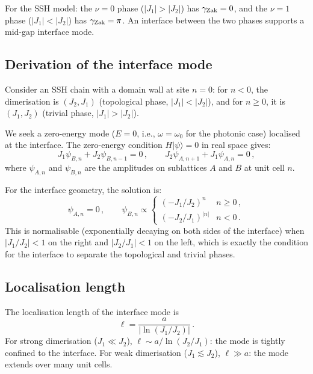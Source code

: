 For the SSH model: the $\nu=0$ phase ($|J_1|>|J_2|$) has $\gamma_{\mathrm{Zak}}=0$,
and the $\nu=1$ phase ($|J_1|<|J_2|$) has $\gamma_{\mathrm{Zak}}=\pi$.  An interface
between the two phases supports a mid-gap interface mode.

\subsection{Derivation of the interface mode}
\label{sec:ch14-interface-derivation}

Consider an SSH chain with a domain wall at site $n=0$: for $n<0$, the
dimerisation is $(J_2,J_1)$ (topological phase, $|J_1|<|J_2|$), and for
$n\geq 0$, it is $(J_1,J_2)$ (trivial phase, $|J_1|>|J_2|$).

We seek a zero-energy mode ($E=0$, i.e., $\omega=\omega_0$ for the
photonic case) localised at the interface.  The zero-energy condition
$H|\psi\rangle=0$ in real space gives:
\begin{equation}\label{eq:ch14-zero-energy}
  J_1\psi_{B,n} + J_2\psi_{B,n-1} = 0\,,\qquad
  J_2\psi_{A,n+1} + J_1\psi_{A,n} = 0\,,
\end{equation}
where $\psi_{A,n}$ and $\psi_{B,n}$ are the amplitudes on sublattices
$A$ and $B$ at unit cell $n$.

For the interface geometry, the solution is:
\begin{equation}\label{eq:ch14-interface-mode}
  \psi_{A,n} = 0\,,\qquad
  \psi_{B,n} \propto
  \begin{cases}
    (-J_1/J_2)^n & n\geq 0\,,\\
    (-J_2/J_1)^{|n|} & n<0\,.
  \end{cases}
\end{equation}
This is normalisable (exponentially decaying on both sides of the
interface) when $|J_1/J_2|<1$ on the right and $|J_2/J_1|<1$ on the
left, which is exactly the condition for the interface to separate the
topological and trivial phases.

\subsection{Localisation length}
\label{sec:ch14-localisation}

The localisation length of the interface mode is
\begin{equation}\label{eq:ch14-localisation-length}
  \ell = \frac{a}{|\ln(J_1/J_2)|}\,.
\end{equation}
For strong dimerisation ($J_1\ll J_2$), $\ell\sim a/\ln(J_2/J_1)$:
the mode is tightly confined to the interface.  For weak dimerisation
($J_1\lesssim J_2$), $\ell\gg a$: the mode extends over many unit
cells.

